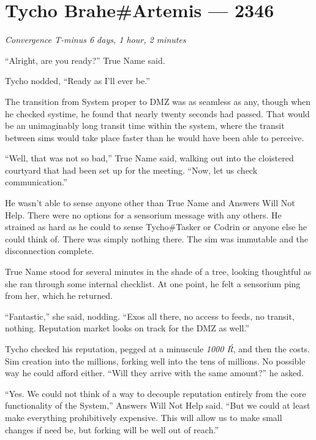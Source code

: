\hypertarget{tycho-braheartemis-2346}{%
\chapter{Tycho Brahe\#Artemis — 2346}\label{tycho-braheartemis-2346}}

\begin{center}
\emph{Convergence T-minus 6 days, 1 hour, 2 minutes}
\end{center}

\noindent ``Alright, are you ready?'' True Name said.

Tycho nodded, ``Ready as I'll ever be.''

The transition from System proper to DMZ was as seamless as any, though when he checked systime, he found that nearly twenty seconds had passed. That would be an unimaginably long transit time within the system, where the transit between sims would take place faster than he would have been able to perceive.

``Well, that was not so bad,'' True Name said, walking out into the cloistered courtyard that had been set up for the meeting. ``Now, let us check communication.''

He wasn't able to sense anyone other than True Name and Answers Will Not Help. There were no options for a sensorium message with any others. He strained as hard as he could to sense Tycho\#Tasker or Codrin or anyone else he could think of. There was simply nothing there. The sim was immutable and the disconnection complete.

True Name stood for several minutes in the shade of a tree, looking thoughtful as she ran through some internal checklist. At one point, he felt a sensorium ping from her, which he returned.

``Fantastic,'' she said, nodding. ``Exos all there, no access to feeds, no transit, nothing. Reputation market looks on track for the DMZ as well.''

Tycho checked his reputation, pegged at a minuscule \emph{1000 Ŕ}, and then the costs. Sim creation into the millions, forking well into the tens of millions. No possible way he could afford either. ``Will they arrive with the same amount?'' he asked.

``Yes. We could not think of a way to decouple reputation entirely from the core functionality of the System,'' Answers Will Not Help said. ``But we could at least make everything prohibitively expensive. This will allow us to make small changes if need be, but forking will be well out of reach.''

